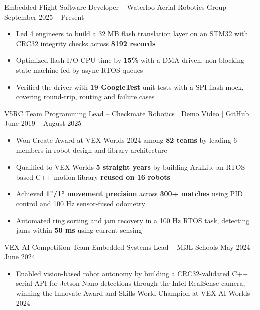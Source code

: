 \documentclass[11pt]{article}       %
\newcommand{\textsb}[1]{{\fontseries{sb}\selectfont #1}}
\begin{document}
\vspace{6pt}

\textsb{Embedded Flight Software Developer} -- Waterloo Aerial Robotics Group \hfill September 2025 -- Present \\
\begin{itemize}
    \item Led 4 engineers to build a 32 MB flash translation layer on an STM32 with CRC32 integrity checks across \textbf{8192 records}
    \item Optimized flash I/O CPU time by \textbf{15\%} with a DMA-driven, non-blocking state machine fed by async RTOS queues
    \item Verified the driver with \textbf{19 GoogleTest} unit tests with a SPI flash mock, covering round-trip, routing and failure cases
\end{itemize}

\vspace{6pt}

\textsb{V5RC Team Programming Lead} -- Checkmate Robotics | \href{https://youtu.be/Ix-q2ixYf8Y}{\underline{Demo Video}} | \href{https://github.com/16868C/VRC2425-HighStakes}{\underline{GitHub}} \hfill June 2019 -- August 2025 \\
\begin{itemize}
    \item Won Create Award at VEX Worlds 2024 among \textbf{82 teams} by leading 6 members in robot design and library architecture
    \item Qualified to VEX Worlds \textbf{5 straight years} by building ArkLib, an RTOS-based C++ motion library \textbf{reused on 16 robots}
    \item Achieved \textbf{1"/1° movement precision} across \textbf{300+ matches} using PID control and 100 Hz sensor-fused odometry
    \item Automated ring sorting and jam recovery in a 100 Hz RTOS task, detecting jams within \textbf{50 ms} using current sensing
\end{itemize}

\vspace{6pt}

\textsb{VEX AI Competition Team Embedded Systems Lead} -- Mi3L Schools \hfill May 2024 -- June 2024 \\
\begin{itemize}
    \item Enabled vision-based robot autonomy by building a CRC32-validated C++ serial API for Jetson Nano detections through the Intel RealSense camera, winning the Innovate Award and Skills World Champion at VEX AI Worlds 2024
\end{itemize}
\end{document}
